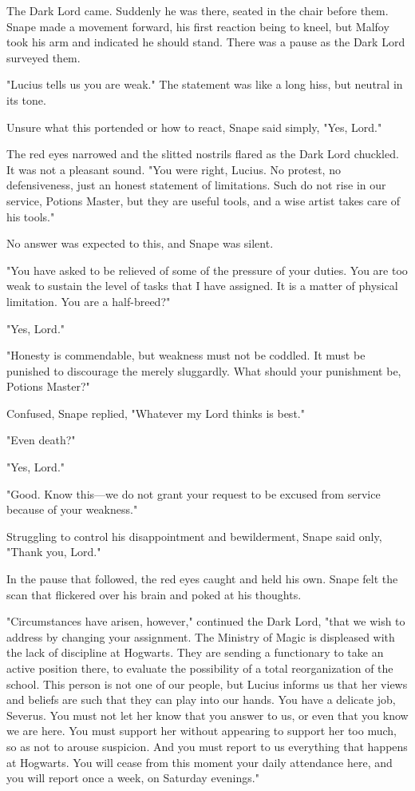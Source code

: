 The Dark Lord came. Suddenly he was there, seated in the chair before them. Snape made a movement forward, his first reaction being to kneel, but Malfoy took his arm and indicated he should stand. There was a pause as the Dark Lord surveyed them.

"Lucius tells us you are weak." The statement was like a long hiss, but neutral in its tone.

Unsure what this portended or how to react, Snape said simply, "Yes, Lord."

The red eyes narrowed and the slitted nostrils flared as the Dark Lord chuckled. It was not a pleasant sound. "You were right, Lucius. No protest, no defensiveness, just an honest statement of limitations. Such do not rise in our service, Potions Master, but they are useful tools, and a wise artist takes care of his tools."

No answer was expected to this, and Snape was silent.

"You have asked to be relieved of some of the pressure of your duties. You are too weak to sustain the level of tasks that I have assigned. It is a matter of physical limitation. You are a half-breed?"

"Yes, Lord."

"Honesty is commendable, but weakness must not be coddled. It must be punished to discourage the merely sluggardly. What should your punishment be, Potions Master?"

Confused, Snape replied, "Whatever my Lord thinks is best."

"Even death?"

"Yes, Lord."

"Good. Know this—we do not grant your request to be excused from service because of your weakness."

Struggling to control his disappointment and bewilderment, Snape said only, "Thank you, Lord."

In the pause that followed, the red eyes caught and held his own. Snape felt the scan that flickered over his brain and poked at his thoughts.

"Circumstances have arisen, however," continued the Dark Lord, "that we wish to address by changing your assignment. The Ministry of Magic is displeased with the lack of discipline at Hogwarts. They are sending a functionary to take an active position there, to evaluate the possibility of a total reorganization of the school. This person is not one of our people, but Lucius informs us that her views and beliefs are such that they can play into our hands. You have a delicate job, Severus. You must not let her know that you answer to us, or even that you know we are here. You must support her without appearing to support her too much, so as not to arouse suspicion. And you must report to us everything that happens at Hogwarts. You will cease from this moment your daily attendance here, and you will report once a week, on Saturday evenings."


